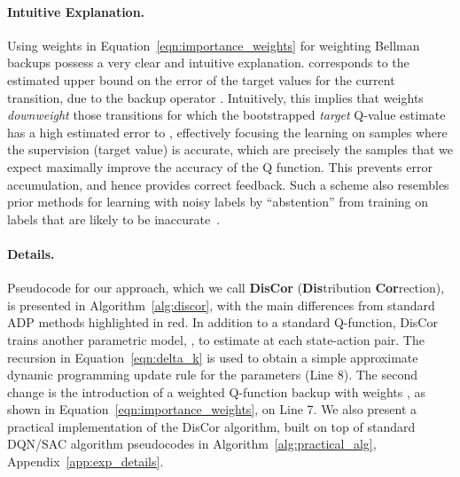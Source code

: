 \documentclass[jmlr]{article}
\begin{document}
\paragraph{Intuitive Explanation.} Using weights  in Equation~\ref{eqn:importance_weights} for weighting Bellman backups possess a very clear and intuitive explanation.  corresponds to the estimated upper bound on the error of the target values for the current transition, due to the backup operator . Intuitively, this implies that weights  \textit{downweight} those transitions for which the bootstrapped \emph{target} Q-value estimate has a high estimated error to , 
effectively focusing the learning on samples where the supervision (target value) is accurate,
which are precisely the samples that we expect maximally improve the accuracy of the Q function. 
This prevents error accumulation, and hence provides correct feedback. Such a scheme also resembles prior methods for learning with noisy labels by ``abstention'' from training on labels that are likely to be inaccurate~\citep{absention}.


\paragraph{Details.} Pseudocode for our approach, which we call \textbf{DisCor} (\textbf{Dis}tribution \textbf{Cor}rection), is presented in Algorithm~\ref{alg:discor}, with the main differences from standard ADP methods highlighted in red. In addition to a standard Q-function, DisCor trains another parametric model, , to estimate  at each state-action pair. The recursion in Equation~\ref{eqn:delta_k} is used to obtain a simple approximate dynamic programming update rule for the parameters  (Line 8).
The second change is the introduction of a weighted Q-function backup with weights , as shown in Equation~\ref{eqn:importance_weights}, on Line 7. 
We also present a practical implementation of the DisCor algorithm, built on top of standard DQN/SAC algorithm pseudocodes in Algorithm~\ref{alg:practical_alg}, Appendix~\ref{app:exp_details}. 
\end{document}
